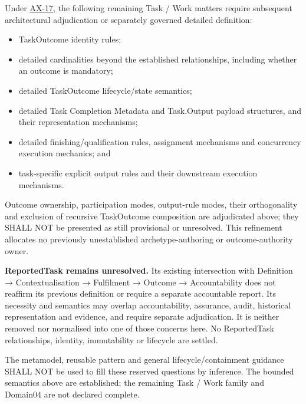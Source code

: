 Under \hyperref[element:8882573df7ce43c6bc0f66da0a676139]{AX-17}, the following
remaining Task / Work matters require subsequent architectural adjudication
or separately governed detailed definition:



\begin{itemize}


\item TaskOutcome identity rules;

\item detailed cardinalities beyond the established relationships, including
  whether an outcome is mandatory;

\item detailed TaskOutcome lifecycle/state semantics;

\item detailed Task Completion Metadata and Task.Output payload structures, and
  their representation mechanisms;

\item detailed finishing/qualification rules, assignment mechanisms and
  concurrency execution mechanics; and

\item task-specific explicit output rules and their downstream execution
  mechanisms.

\end{itemize}


Outcome ownership, participation modes, output-rule modes, their orthogonality
and exclusion of recursive TaskOutcome composition are adjudicated above;
they SHALL NOT be presented as still provisional or unresolved. This
refinement allocates no previously unestablished archetype-authoring or
outcome-authority owner.



\textbf{ReportedTask remains unresolved.} Its existing intersection with
Definition → Contextualisation → Fulfilment → Outcome → Accountability does
not reaffirm its previous definition or require a separate accountable report.
Its necessity and semantics may overlap accountability, assurance, audit,
historical representation and evidence, and require separate adjudication.
It is neither removed nor normalised into one of those concerns here. No
ReportedTask relationships, identity, immutability or lifecycle are settled.



The metamodel, reusable pattern and general lifecycle/containment guidance
SHALL NOT be used to fill these reserved questions by inference. The bounded
semantics above are established; the remaining Task / Work family and Domain04
are not declared complete.


